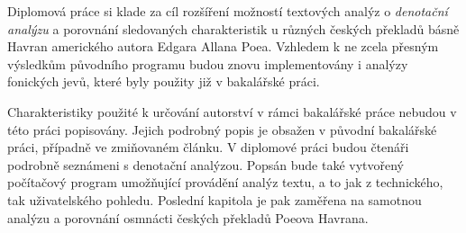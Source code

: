 \documentclass[dp.tex]{subfiles}
\begin{document}
Diplomová práce si klade za cíl rozšíření možností textových analýz o \textit{denotační analýzu} a porovnání sledovaných charakteristik u různých českých překladů básně Havran amerického autora Edgara Allana Poea. Vzhledem k ne zcela přesným výsledkům původního programu budou znovu implementovány i analýzy fonických jevů, které byly použity již v bakalářské práci.

Charakteristiky použité k určování autorství v rámci bakalářské práce nebudou v této práci popisovány. Jejich podrobný popis je obsažen v původní bakalářské práci, případně ve zmiňovaném článku. V diplomové práci budou čtenáři podrobně seznámeni s denotační analýzou. Popsán bude také vytvořený počítačový program umožňující provádění analýz textu, a to jak z technického, tak uživatelského pohledu. Poslední kapitola je pak zaměřena na samotnou analýzu a porovnání osmnácti českých překladů Poeova Havrana.
\end{document}
